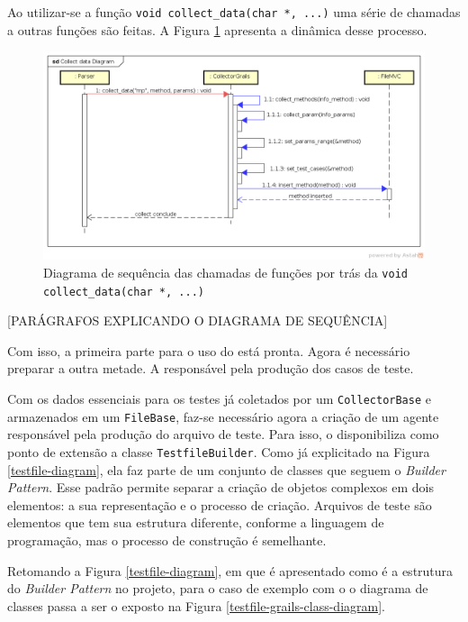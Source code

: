 Ao utilizar-se a função \lstinline|void collect_data(char *, ...)| uma série
de chamadas a outras funções são feitas. A Figura \ref{collect-data-sequence-diagram}
apresenta a dinâmica desse processo.
\begin{landscape}
\begin{figure}[h]
  \centering
    \includegraphics[width=1.5\textwidth]{figuras/collect-data-sequence-diagram.png}
    \caption{Diagrama de sequência das chamadas de funções por trás da \lstinline|void collect_data(char *, ...)|}
    \label{collect-data-sequence-diagram}
\end{figure}
\FloatBarrier
\end{landscape}

[PARÁGRAFOS EXPLICANDO O DIAGRAMA DE SEQUÊNCIA]

Com isso, a primeira parte para o uso do \scarefault está pronta. Agora é
necessário preparar a outra metade. A responsável pela produção dos casos
de teste.

Com os dados essenciais para os testes já coletados por um
\lstinline|CollectorBase| e armazenados em um \lstinline|FileBase|,
faz-se necessário agora a criação de um agente responsável pela
produção do arquivo de teste. Para isso, o \framework disponibiliza como
ponto de extensão a classe \lstinline|TestfileBuilder|. Como já explicitado
na Figura \ref{testfile-diagram}, ela faz parte de um conjunto de classes
que seguem o \textit{Builder Pattern}. Esse padrão permite separar a criação
de objetos complexos em dois elementos: a sua representação e o processo de
criação. Arquivos de teste são elementos que tem sua estrutura diferente, conforme
a linguagem de programação, mas o processo de construção é semelhante.

Retomando a Figura \ref{testfile-diagram}, em que é apresentado como é a
estrutura do \textit{Builder Pattern} no projeto, para o caso de exemplo
com o \grails o diagrama de classes passa a ser o exposto na Figura
\ref{testfile-grails-class-diagram}.

